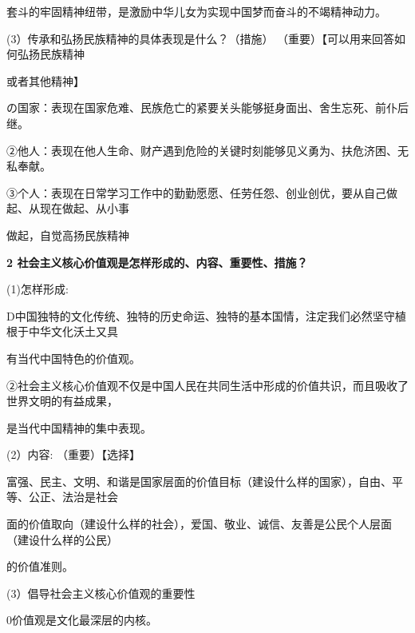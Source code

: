 \documentclass[lang=cn,11pt]{elegantbook}
\newcommand{\daofasym}[1]{{\daofasymbolfont #1}}
\newcommand{\daofasym}[1]{#1}
\begin{document}
套斗的牢固精神纽带，是激励中华儿女为实现中国梦而奋斗的不竭精神动力。\par

(3）传承和弘扬民族精神的具体表现是什么？（措施） （重要）【可以用来回答如何弘扬民族精神\par

或者其他精神】\par

の国家：表现在国家危难、民族危亡的紧要关头能够挺身面出、舍生忘死、前仆后继。\par

\daofasym{②}他人：表现在他人生命、财产遇到危险的关键时刻能够见义勇为、扶危济困、无私奉献。\par

\daofasym{③}个人：表现在日常学习工作中的勤勤愿愿、任劳任怨、创业创优，要从自己做起、从现在做起、从小事\par

做起，自觉高扬民族精神\par

\textbf{2 社会主义核心价值观是怎样形成的、内容、重要性、措施？}\par

(1)怎样形成:\par

D中国独特的文化传统、独特的历史命运、独特的基本国情，注定我们必然坚守植根于中华文化沃土又具\par

有当代中国特色的价值观。\par

\daofasym{②}社会主义核心价值观不仅是中国人民在共同生活中形成的价值共识，而且吸收了世界文明的有益成果，\par

是当代中国精神的集中表现。\par

(2）内容: （重要）【选择】\par

富强、民主、文明、和谐是国家层面的价值目标（建设什么样的国家），自由、平等、公正、法治是社会\par

面的价值取向（建设什么样的社会），爱国、敬业、诚信、友善是公民个人层面（建设什么样的公民）\par

的价值准则。\par

(3）倡导社会主义核心价值观的重要性\par

0价值观是文化最深层的内核。\par
\end{document}
